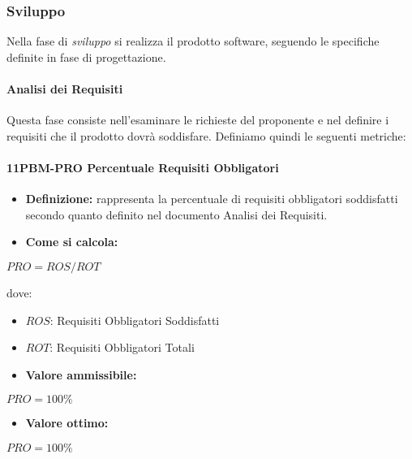 \subsubsection{Sviluppo}
Nella fase di \emph{sviluppo} si realizza il prodotto software, seguendo le specifiche definite in fase di progettazione.
\paragraph{Analisi dei Requisiti}
Questa fase consiste nell'esaminare le richieste del proponente e nel definire i requisiti che il prodotto dovrà soddisfare. Definiamo quindi le seguenti metriche:

\paragraph*{11PBM-PRO Percentuale Requisiti Obbligatori}
\begin{itemize}
    \item \textbf{Definizione:} rappresenta la percentuale di requisiti obbligatori soddisfatti secondo quanto definito nel documento Analisi dei Requisiti.
    \item \textbf{Come si calcola:}
\end{itemize}
\begin{center}
   $PRO = ROS/ROT$ 
\end{center}
dove:
\begin{itemize}[label=$\rightarrow$]
    \item $ROS$: Requisiti Obbligatori Soddisfatti
    \item $ROT$: Requisiti Obbligatori Totali
\end{itemize}
\begin{itemize}
    \item \textbf{Valore ammissibile:}
\end{itemize}
\begin{center}
    $PRO = 100\%$
\end{center}
\begin{itemize}
    \item \textbf{Valore ottimo:}
\end{itemize}
\begin{center}
    $PRO = 100\%$
\end{center}

